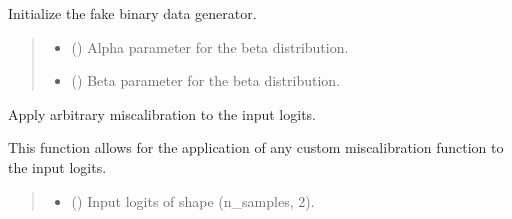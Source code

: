 \documentclass[letterpaper,10pt,english]{sphinxmanual}
\begin{document}
\begin{fulllineitems}
\begin{fulllineitems}
\end{fulllineitems}


\begin{fulllineitems}
\label{\detokenize{calzone:calzone.utils.fake_binary_data_generator.__init__}}
\pysigstartsignatures
{}
\pysigstopsignatures
\sphinxAtStartPar
Initialize the fake binary data generator.
\begin{quote}\begin{description}
\begin{itemize}
\item {} 
\sphinxAtStartPar
{} () \textendash{} Alpha parameter for the beta distribution.

\item {} 
\sphinxAtStartPar
{} () \textendash{} Beta parameter for the beta distribution.

\end{itemize}

\end{description}\end{quote}

\end{fulllineitems}


\begin{fulllineitems}
\label{\detokenize{calzone:calzone.utils.fake_binary_data_generator.abraitary_miscal}}
\pysigstartsignatures
{}
\pysigstopsignatures
\sphinxAtStartPar
Apply arbitrary miscalibration to the input logits.

\sphinxAtStartPar
This function allows for the application of any custom miscalibration
function to the input logits.
\begin{quote}\begin{description}
\begin{itemize}
\item {} 
\sphinxAtStartPar
{} () \textendash{} Input logits of shape (n\_samples, 2).


\end{itemize}
\end{description}
\end{quote}
\end{fulllineitems}
\end{fulllineitems}
\end{document}
